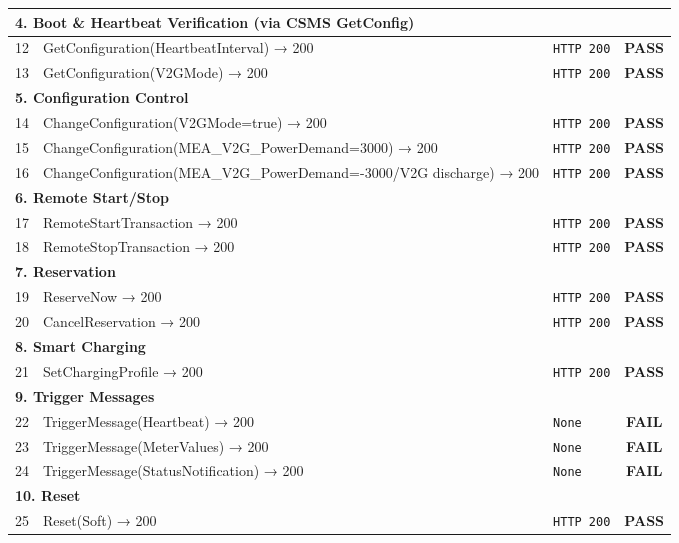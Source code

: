 \documentclass[10pt, a4paper]{article}
\begin{document}
\begin{longtable}{|c|p{6cm}|p{5cm}|c|}
\hline
\multicolumn{4}{|l|}{\cellcolor{blue!8}\textbf{4. Boot \& Heartbeat Verification (via CSMS GetConfig)}} \\
\hline
12 & GetConfiguration(HeartbeatInterval) → 200 & \texttt{HTTP 200} & \textcolor{passgreen}{\textbf{PASS}} \\
\hline
13 & GetConfiguration(V2GMode) → 200 & \texttt{HTTP 200} & \textcolor{passgreen}{\textbf{PASS}} \\
\hline
\multicolumn{4}{|l|}{\cellcolor{blue!8}\textbf{5. Configuration Control}} \\
\hline
14 & ChangeConfiguration(V2GMode=true) → 200 & \texttt{HTTP 200} & \textcolor{passgreen}{\textbf{PASS}} \\
\hline
15 & ChangeConfiguration(MEA\_V2G\_PowerDemand=3000) → 200 & \texttt{HTTP 200} & \textcolor{passgreen}{\textbf{PASS}} \\
\hline
16 & ChangeConfiguration(MEA\_V2G\_PowerDemand=-3000/V2G discharge) → 200 & \texttt{HTTP 200} & \textcolor{passgreen}{\textbf{PASS}} \\
\hline
\multicolumn{4}{|l|}{\cellcolor{blue!8}\textbf{6. Remote Start/Stop}} \\
\hline
17 & RemoteStartTransaction → 200 & \texttt{HTTP 200} & \textcolor{passgreen}{\textbf{PASS}} \\
\hline
18 & RemoteStopTransaction → 200 & \texttt{HTTP 200} & \textcolor{passgreen}{\textbf{PASS}} \\
\hline
\multicolumn{4}{|l|}{\cellcolor{blue!8}\textbf{7. Reservation}} \\
\hline
19 & ReserveNow → 200 & \texttt{HTTP 200} & \textcolor{passgreen}{\textbf{PASS}} \\
\hline
20 & CancelReservation → 200 & \texttt{HTTP 200} & \textcolor{passgreen}{\textbf{PASS}} \\
\hline
\multicolumn{4}{|l|}{\cellcolor{blue!8}\textbf{8. Smart Charging}} \\
\hline
21 & SetChargingProfile → 200 & \texttt{HTTP 200} & \textcolor{passgreen}{\textbf{PASS}} \\
\hline
\multicolumn{4}{|l|}{\cellcolor{blue!8}\textbf{9. Trigger Messages}} \\
\hline
22 & TriggerMessage(Heartbeat) → 200 & \texttt{None} & \textcolor{failred}{\textbf{FAIL}} \\
\hline
23 & TriggerMessage(MeterValues) → 200 & \texttt{None} & \textcolor{failred}{\textbf{FAIL}} \\
\hline
24 & TriggerMessage(StatusNotification) → 200 & \texttt{None} & \textcolor{failred}{\textbf{FAIL}} \\
\hline
\multicolumn{4}{|l|}{\cellcolor{blue!8}\textbf{10. Reset}} \\
\hline
25 & Reset(Soft) → 200 & \texttt{HTTP 200} & \textcolor{passgreen}{\textbf{PASS}} \\
\hline

\end{longtable}
\end{document}
